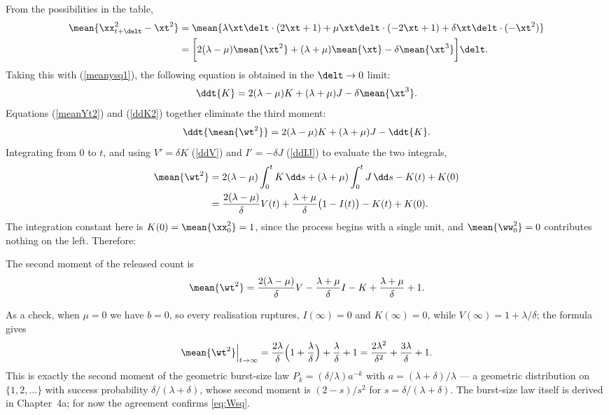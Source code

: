 \noindent
From the possibilities in the table,
\begin{align*}
\mean{\xx_{t+\delt}^2 - \xt^2}
&=\mean{\lambda \xt\delt\cdot(2\xt+1) + \mu \xt\delt\cdot(-2\xt+1) + \delta \xt\delt\cdot(-\xt^2)}\\
&=\bigg[ 2(\lambda-\mu)\mean{\xt^2} + (\lambda+\mu)\mean{\xt} - \delta\mean{\xt^3} \bigg]\delt.
\end{align*}
Taking this with (\ref{meanysq1}), the following equation is obtained in the
$\delt\to0$ limit:
\begin{equation}
\label{ddK2}
\ddt{K} =2(\lambda-\mu)K+ (\lambda + \mu)J- \delta\mean{\xt^3}.
\end{equation}
Equations (\ref{meanYt2}) and (\ref{ddK2}) together eliminate the third moment:
\begin{equation}
\label{dWsqOde}
\ddt{\mean{\wt^2}} = 2(\lambda-\mu)K + (\lambda+\mu)J - \ddt{K}.
\end{equation}
Integrating from $0$ to $t$, and using $V'=\delta K$ (\ref{ddV}) and
$I'=-\delta J$ (\ref{ddIJ}) to evaluate the two integrals,
\begin{align*}
\mean{\wt^2}
&= 2(\lambda-\mu)\int_0^t K\,\dd s + (\lambda+\mu)\int_0^t J\,\dd s - K(t) + K(0)\\
&= \frac{2(\lambda-\mu)}{\delta}V(t) + \frac{\lambda+\mu}{\delta}\bigl(1-I(t)\bigr) - K(t) + K(0).
\end{align*}
The integration constant here is $K(0)=\mean{\xx_0^2}=1$, since the process
begins with a single unit, and $\mean{\ww_0^2}=0$ contributes nothing on the
left. Therefore:

\begin{theorem}
\label{thm:Wsq}
The second moment of the released count is
\begin{equation}
\label{eq:Wsq}
\mean{\wt^2} = \frac{2(\lambda-\mu)}{\delta} V -\frac{\lambda+\mu}{\delta}I -K +\frac{\lambda+\mu}{\delta}+1.
\end{equation}
\end{theorem}

As a check, when $\mu=0$ we have $b=0$, so every realisation ruptures,
$I(\infty)=0$ and $K(\infty)=0$, while $V(\infty)=1+\lambda/\delta$; the
formula gives
$$\mean{\wt^2}\Big|_{t\to\infty} = \frac{2\lambda}{\delta}\Bigl(1+\frac{\lambda}{\delta}\Bigr) + \frac{\lambda}{\delta} + 1 = \frac{2\lambda^2}{\delta^2}+\frac{3\lambda}{\delta}+1.$$
This is exactly the second moment of the geometric burst-size law
$P_k=(\delta/\lambda)a^{-k}$ with $a=(\lambda+\delta)/\lambda$ --- a geometric
distribution on $\{1,2,\ldots\}$ with success probability
$\delta/(\lambda+\delta)$, whose second moment is $(2-s)/s^2$ for $s=\delta/(\lambda+\delta)$.
The burst-size law itself is derived in Chapter~4a; for now the agreement
confirms \eqref{eq:Wsq}.


